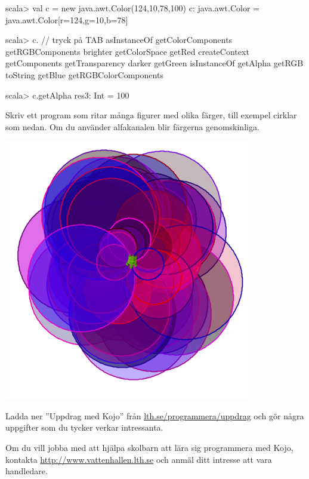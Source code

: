 \begin{REPL}
scala> val c = new java.awt.Color(124,10,78,100)
c: java.awt.Color = java.awt.Color[r=124,g=10,b=78]

scala> c.  // tryck på TAB
asInstanceOf    getColorComponents      getRGBComponents
brighter        getColorSpace           getRed
createContext   getComponents           getTransparency
darker          getGreen                isInstanceOf
getAlpha        getRGB                  toString
getBlue         getRGBColorComponents

scala> c.getAlpha
res3: Int = 100
\end{REPL}
Skriv ett program som ritar många figurer med olika färger, till exempel cirklar som nedan. Om du använder alfakanalen blir färgerna genomskinliga.

\includegraphics[width=0.82\textwidth]{../img/kojo/random-color-circles.png}


\Task Ladda ner ''Uppdrag med Kojo'' från \href{http://lth.se/programmera/uppdrag}{lth.se/programmera/uppdrag}  och gör några uppgifter som du tycker verkar intressanta.


\Task Om du vill jobba med att hjälpa skolbarn att lära sig programmera med Kojo, kontakta \url{http://www.vattenhallen.lth.se} och anmäl ditt intresse att vara handledare.
